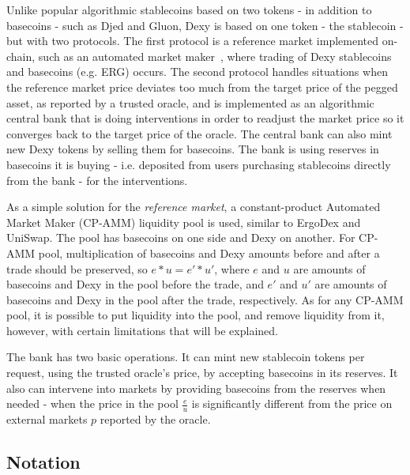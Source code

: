 \documentclass[a4paper,UKenglish,cleveref, autoref, thm-restate]{lipics-v2021}
\newcommand{\bc}{ERG}
\newcommand{\sct}{stablecoin}
\newcommand{\dx}{Dexy}
\begin{document}
Unlike popular algorithmic stablecoins based on two tokens - in addition to basecoins - such as Djed and Gluon, \dx{} is based on one token - the stablecoin - but with two protocols. The first protocol is a reference market implemented on-chain, such as an automated market maker~\cite{xu2021sok}, where trading of \dx{} stablecoins and basecoins  (e.g. \bc{}) occurs. The second protocol handles situations when the reference market price deviates too much from the target price of the pegged asset, as reported by a trusted oracle, and is implemented as an algorithmic central bank that is doing interventions in order to readjust the market price so it converges back to the target price of the oracle. The central bank can also mint new \dx{} tokens by selling them for basecoins. The bank is using reserves in basecoins it is buying - i.e. deposited from users purchasing stablecoins directly from the bank - for the interventions. 

As a simple solution for the {\em reference market}, a constant-product Automated Market Maker (CP-AMM) liquidity pool is used, similar to ErgoDex and UniSwap. The pool has basecoins on one side and \dx{} on another. For CP-AMM pool, multiplication of basecoins and \dx{} amounts before and after a trade should be preserved, so $e * u = e' * u'$, where $e$ and $u$ are amounts of basecoins and \dx{} in the pool before the trade, and $e'$ and $u'$ are amounts of basecoins and \dx{} in the pool after the trade, respectively. As for any CP-AMM pool, it is possible to put liquidity into the pool, and remove liquidity from it, however, with certain limitations that will be explained.

The bank has two basic operations. It can mint new \sct{} tokens per request, using the trusted oracle's price, by accepting basecoins in its reserves. It also can intervene into markets by providing basecoins from the reserves when needed - when the price in the pool $\frac{e}{u}$ is significantly different from the price on external markets $p$ reported by the oracle.

\subsection{Notation}
\end{document}
